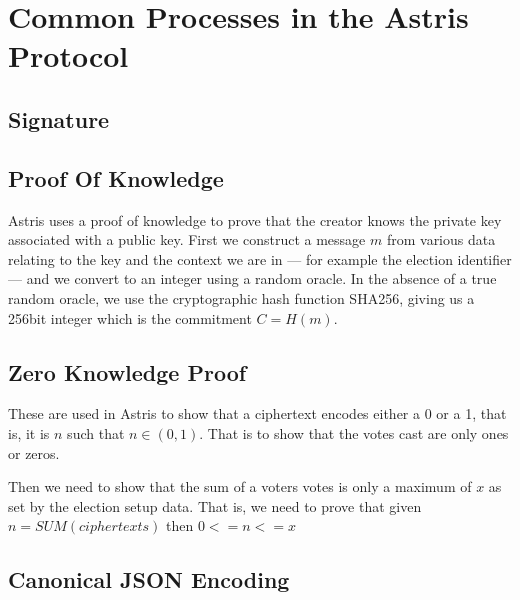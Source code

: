 \chapter{Common Processes in the Astris Protocol}
\label{appendix:processes}

\section*{Signature}
\label{proc:sign}



\section*{Proof Of Knowledge}
\label{proc:pok}

Astris uses a proof of knowledge to prove that the creator knows the private key associated with a public key.
First we construct a message $m$ from various data relating to the key and the context we are in --- for example the election identifier --- and we convert to an integer using a random oracle. In the absence of a true random oracle, we use the cryptographic hash function SHA256, giving us a 256bit integer which is the commitment $C = H(m)$.


\section*{Zero Knowledge Proof}
\label{proc:zkp}

These are used in Astris to show that a ciphertext encodes either a 0 or a 1, that is, it is $n$ such that $n \in (0,1)$.
That is to show that the votes cast are only ones or zeros.

Then we need to show that the sum of a voters votes is only a maximum of $x$ as set by the election setup data. That is, we need to prove that given $n = SUM(ciphertexts)$ then $0 <= n <= x$



\section*{Canonical JSON Encoding}
\label{proc:json}

